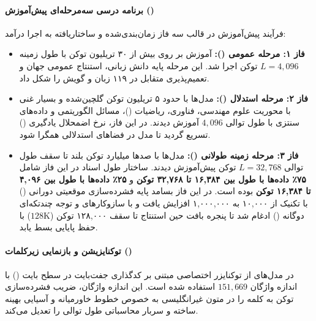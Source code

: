 \paragraph*{برنامه درسی سه‌مرحله‌ای پیش‌آموزش ()}
فرآیند پیش‌آموزش در قالب سه فاز زمان‌بندی‌شده و ساختاریافته به اجرا درآمد:
\begin{itemize}
    \item \textbf{فاز ۱: مرحله عمومی ():} آموزش بر روی بیش از ۳۰ تریلیون توکن با طول زمینه $L = 4{,}096$ توکن اجرا شد. این مرحله پایه دانش زبانی، استنتاج عمومی جهان و تعمیم‌پذیری متقابل در ۱۱۹ زبان و گویش را شکل داد.
    \item \textbf{فاز ۲: مرحله استدلال ():} مدل‌ها با حدود ۵ تریلیون توکن گلچین‌شده و بسیار غنی با محوریت علوم مهندسی، فناوری، ریاضیات ()، مسائل الگوریتمی و داده‌های سنتزی با طول توالی $4{,}096$ آموزش دیدند. در این فاز، نرخ اضمحلال یادگیری () تسریع گردید تا مدل در فضاهای استدلالی همگرا شود.
    \item \textbf{فاز ۳: مرحله زمینه طولانی ():} مدل‌ها با صدها میلیارد توکن بلند تا سقف طول توالی $L = 32{,}768$ توکن پیش‌آموزش دیدند. ساختار طول اسناد در این فاز شامل \textbf{۷۵٪ داده‌ها با طول بین ۱۶,۳۸۴ تا ۳۲,۷۶۸ توکن} و \textbf{۲۵٪ داده‌ها با طول بین ۴,۰۹۶ تا ۱۶,۳۸۴ توکن} بوده است. در این فاز بسامد پایه فشرده‌سازی موقعیتی دورانی () \cite{su2024roformer} با تکنیک  \cite{xiong2023effective} از ۱۰,۰۰۰ به ۱,۰۰۰,۰۰۰ افزایش یافت و با سازوکارهای  \cite{peng2023yarn} و توجه چندتکه‌ای دوگانه () \cite{an2024dca} ادغام شد تا پنجره بافت حین استنتاج تا سقف ۱۲۸,۰۰۰ توکن ($128\text{K}$) با حفظ پایایی بسط یابد.
\end{itemize}

\paragraph*{توکنایزیشن و بازنمایی زیرکلمات ()}
در مدل‌های  از توکنایزر اختصاصی مبتنی بر کدگذاری جفت‌بایت در سطح بایت () \cite{bai2023qwen, brown2020language, wang2020neural, sennrich2016neural} با اندازه واژگان $151{,}669$ استفاده شده است. این اندازه واژگان، ضریب فشرده‌سازی توکن به کلمه را در متون غیرانگلیسی به خصوص خطوط خاورمیانه و آسیایی بهینه ساخته و سربار محاسباتی طول توالی را تعدیل می‌کند.

